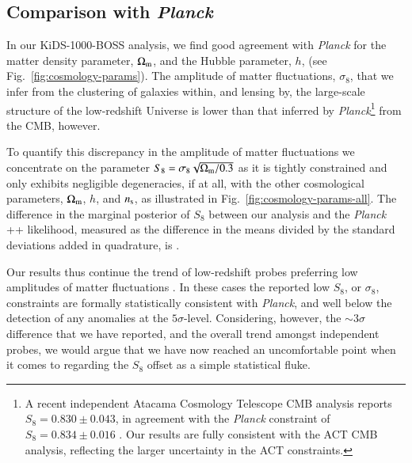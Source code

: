 \subsection{Comparison with {\it Planck}}
\label{sec:planck_comp}
In our KiDS-1000-BOSS \tttp analysis, we find good agreement with {\it Planck} for the matter density parameter, $\Omega_{\rm m}$, and the Hubble parameter, $h$, (see Fig.~\ref{fig:cosmology-params}).
The amplitude of matter fluctuations, $\sigma_8$, that we infer from the clustering of galaxies within, and lensing by, the large-scale structure of the low-redshift Universe is lower than that inferred by {\it Planck}\footnote{A recent independent Atacama Cosmology Telescope CMB analysis reports $S_8=0.830 \pm 0.043$, in agreement with the {\it Planck} constraint of $S_8=0.834 \pm 0.016$ \citep[ACT,][]{aiola/etal:2020}.   Our results are fully consistent with the ACT CMB analysis, reflecting the larger uncertainty in the ACT constraints.} from the CMB, however. 

To quantify this discrepancy in the amplitude of matter fluctuations we concentrate on the parameter $S_{8} = \sigma_8 \sqrt{\Omega_{\rm m}/0.3}$ as it is tightly constrained and only exhibits negligible degeneracies, if at all, with the other cosmological parameters, $\Omega_{\rm m}$, $h$, and $n_{\rm s}$, as illustrated in Fig.~\ref{fig:cosmology-params-all}. 
%
The difference in the marginal posterior of $S_{8}$ between our \tttp analysis and the {\it Planck} ++ likelihood, measured as the difference in the means divided by the standard deviations added in quadrature, is \kpoff.

Our results thus continue the trend of low-redshift probes preferring low amplitudes of matter fluctuations \citep{heymans/etal:2013, alam/etal:2017, abbott/etal:2018, hikage/etal:2019, wright/etal:2020b,DESclusters/etal:2020}. 
In these cases the reported low $S_8$, or $\sigma_8$, constraints are formally statistically consistent with {\it Planck}, and well below the detection of any anomalies at the $5\sigma$-level. 
Considering, however, the $\sim 3\sigma$ difference that we have reported, and the overall trend amongst independent probes, we would argue that we have now reached an uncomfortable point when it comes to regarding the $S_8$ offset as a simple statistical fluke.

